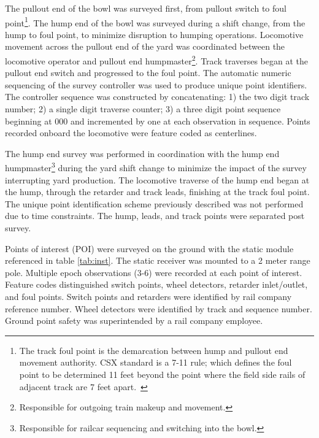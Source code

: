 The pullout end of the bowl was surveyed first, from pullout switch to foul point\footnote{The track foul point is the demarcation between hump and pullout end movement authority. CSX standard is a 7-11 rule; which defines the foul point to be determined 11 feet beyond the point where the field side rails of adjacent track are 7 feet apart.~\citep{vanWormer07}}. The hump end of the bowl was surveyed during a shift change, from the hump to foul point, to minimize disruption to humping operations. Locomotive movement across the pullout end of the yard was coordinated between the locomotive operator and pullout end humpmaster\footnote{Responsible for outgoing train makeup and movement.}. Track traverses began at the pullout end switch and progressed to the foul point. The automatic numeric sequencing of the survey controller was used to produce unique point identifiers. The controller sequence was constructed by concatenating: 1) the  two digit track number; 2) a single digit traverse counter; 3) a three digit point sequence beginning at 000 and incremented by one at each observation in sequence. Points recorded onboard the locomotive were feature coded as centerlines.

The hump end survey was performed in coordination with the hump end humpmaster\footnote{Responsible for railcar sequencing and switching into the bowl.} during the yard shift change to minimize the impact of the survey interrupting yard production. The locomotive traverse of the hump end began at the hump, through the retarder and track leads, finishing at the track foul point. The unique point identification scheme previously described was not performed due to time constraints. The hump, leads, and track points were separated post survey.

Points of interest (POI) were surveyed on the ground with the static module referenced in table \ref{tab:inst}. The static receiver was mounted to a 2 meter range pole. Multiple epoch observations (3-6) were recorded at each point of interest. Feature codes distinguished switch points, wheel detectors, retarder inlet/outlet, and foul points. Switch points and retarders were identified by rail company reference number. Wheel detectors were identified by track and sequence number. Ground point safety was superintended by a rail company employee.

